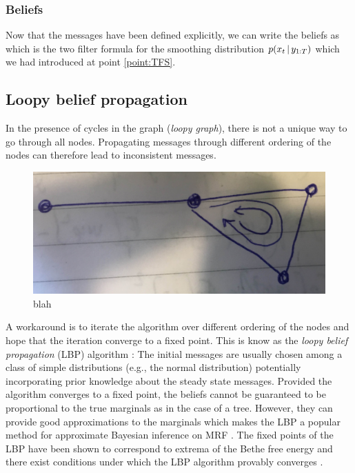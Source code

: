 \subsubsection{Beliefs}
Now that the messages have been defined explicitly, we can write the beliefs as
%
%
which is the two filter formula for the smoothing distribution $p(x_{t}\,|\, y_{1:T})$ which we had introduced at point \ref{point:TFS}.

\subsection{\label{point:LBP}Loopy belief propagation}

In the presence of cycles in the graph (\emph{loopy graph}), there is not a unique way to go through all nodes. 
Propagating messages through different ordering of the nodes can therefore lead to inconsistent messages. 
 
\begin{figure}[!h]
\center
\includegraphics[width=.6\textwidth]{figures/draft/schema_loop}
\caption{blah}
\end{figure}

A workaround is to iterate the algorithm over different ordering of the nodes and hope that the iteration converge to a fixed point. This is know as the \emph{loopy belief propagation} (LBP) algorithm \citep{pearl88, yedidia02}:
%
%
The initial messages are usually chosen among a class of simple distributions (e.g., the normal distribution) potentially incorporating prior knowledge about the steady state messages. 
Provided the algorithm converges to a fixed point, the beliefs cannot be guaranteed to be proportional to the true marginals as in the case of a tree. However, they can provide good approximations to the marginals which makes the LBP a popular method for approximate Bayesian inference on MRF \citep{sudderth03}. The fixed points of the LBP have been shown to correspond to extrema of the Bethe free energy \cite{yedidia02} and there exist conditions under which the LBP algorithm provably converges \citep{heskes04,ihler05}.

